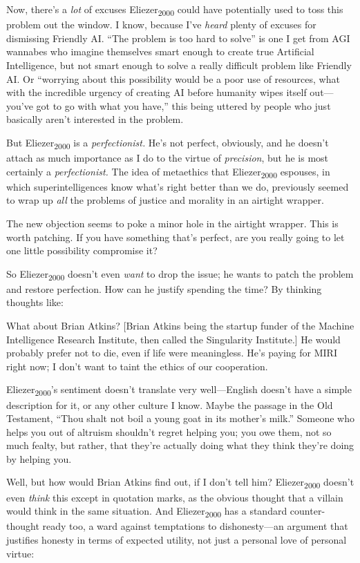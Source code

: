 {
 Now, there's a \textit{lot} of excuses
Eliezer\textsubscript{2000} could have potentially used to toss this
problem out the window. I know, because I've
\textit{heard} plenty of excuses for dismissing Friendly AI.
``The problem is too hard to solve''
is one I get from AGI wannabes who imagine themselves smart enough to
create true Artificial Intelligence, but not smart enough to solve a
really difficult problem like Friendly AI. Or
``worrying about this possibility would be a poor use
of resources, what with the incredible urgency of creating AI before
humanity wipes itself out---you've got to go with what
you have,'' this being uttered by people who just
basically aren't interested in the problem.}

{
 But Eliezer\textsubscript{2000} is a \textit{perfectionist.}
He's not perfect, obviously, and he
doesn't attach as much importance as I do to the virtue
of \textit{precision}, but he is most certainly a
\textit{perfectionist.} The idea of metaethics that
Eliezer\textsubscript{2000} espouses, in which superintelligences know
what's right better than we do, previously seemed to
wrap up \textit{all} the problems of justice and morality in an
airtight wrapper.}

{
 The new objection seems to poke a minor hole in the airtight
wrapper. This is worth patching. If you have something
that's perfect, are you really going to let one little
possibility compromise it?}

{
 So Eliezer\textsubscript{2000} doesn't even
\textit{want} to drop the issue; he wants to patch the problem and
restore perfection. How can he justify spending the time? By thinking
thoughts like:}

{
 What about Brian Atkins? [Brian Atkins being the startup funder of
the Machine Intelligence Research Institute, then called the
Singularity Institute.] He would probably prefer not to die, even if
life were meaningless. He's paying for MIRI right now;
I don't want to taint the ethics of our cooperation.}

{
 Eliezer\textsubscript{2000}'s sentiment
doesn't translate very well---English
doesn't have a simple description for it, or any other
culture I know. Maybe the passage in the Old Testament,
``Thou shalt not boil a young goat in its
mother's milk.'' Someone who helps
you out of altruism shouldn't regret helping you; you
owe them, not so much fealty, but rather, that they're
actually doing what they think they're doing by helping
you.}

{
 Well, but how would Brian Atkins find out, if I
don't tell him? Eliezer\textsubscript{2000}
doesn't even \textit{think} this except in quotation
marks, as the obvious thought that a villain would think in the same
situation. And Eliezer\textsubscript{2000} has a standard
counter-thought ready too, a ward against temptations to
dishonesty---an argument that justifies honesty in terms of expected
utility, not just a personal love of personal virtue:}

